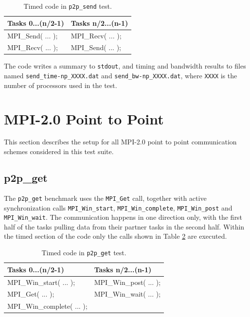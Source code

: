 \documentclass[10pt,a4paper]{report}
\begin{document}
\begin{table}[ht]
\centering
\caption{Timed code in \texttt{p2p\_send} test.}
\label{tab:send}
\begin{tabular}{|l|l|}
\hline
\bf{Tasks 0...(n/2-1)}	& \bf{Tasks n/2...(n-1)}\\\hline
MPI\_Send( ... );       & MPI\_Recv( ... );\\
MPI\_Recv( ... );       & MPI\_Send( ... );\\\hline
\end{tabular}
\end{table}

The code writes a summary to \verb+stdout+, and timing and bandwidth results to files named \verb+send_time-np_XXXX.dat+ and \verb+send_bw-np_XXXX.dat+, where \verb+XXXX+ is the number of processors used in the test.

\FloatBarrier
\section{MPI-2.0 Point to Point}
This section describes the setup for all MPI-2.0 point to point communication schemes considered in this test suite.

\subsection{p2p\_get}
The \verb+p2p_get+ benchmark uses the \verb+MPI_Get+ call, together with active synchronization calls \verb+MPI_Win_start+, \verb+MPI_Win_complete+, \verb+MPI_Win_post+ and \verb+MPI_Win_wait+. The communication happens in one direction only, with the first half of the tasks pulling data from their partner tasks in the second half. Within the timed section of the code only the calls shown in Table \ref{tab:get} are executed.

\begin{table}[ht]
\centering
\caption{Timed code in \texttt{p2p\_get} test.}
\label{tab:get}
\begin{tabular}{|l|l|}
\hline
\bf{Tasks 0...(n/2-1)}	   & \bf{Tasks n/2...(n-1)}\\\hline
MPI\_Win\_start( ... );    & MPI\_Win\_post( ... );\\
MPI\_Get( ... );           & MPI\_Win\_wait( ... );\\
MPI\_Win\_complete( ... ); & \\\hline
\end{tabular}
\end{table}
\end{document}
